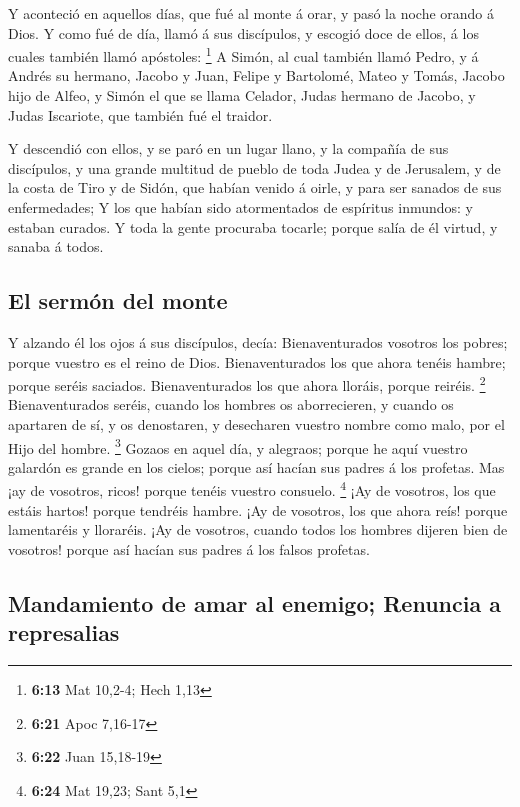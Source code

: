  Y aconteció en aquellos días, que fué al monte á orar, y
pasó la noche orando á Dios.  Y como fué de día, llamó á
sus discípulos, y escogió doce de ellos, á los cuales también llamó
apóstoles: \footnote{\textbf{6:13} Mat 10,2-4; Hech 1,13}
 A Simón, al cual también llamó Pedro, y á Andrés su
hermano, Jacobo y Juan, Felipe y Bartolomé,  Mateo y
Tomás, Jacobo hijo de Alfeo, y Simón el que se llama Celador,
 Judas hermano de Jacobo, y Judas Iscariote, que también
fué el traidor.

 Y descendió con ellos, y se paró en un lugar llano, y la
compañía de sus discípulos, y una grande multitud de pueblo de toda
Judea y de Jerusalem, y de la costa de Tiro y de Sidón, que habían
venido á oirle, y para ser sanados de sus enfermedades; 
Y los que habían sido atormentados de espíritus inmundos: y estaban
curados.  Y toda la gente procuraba tocarle; porque salía
de él virtud, y sanaba á todos.

\hypertarget{el-sermuxf3n-del-monte}{%
\subsection{El sermón del monte}\label{el-sermuxf3n-del-monte}}

 Y alzando él los ojos á sus discípulos, decía:
Bienaventurados vosotros los pobres; porque vuestro es el reino de Dios.
 Bienaventurados los que ahora tenéis hambre; porque
seréis saciados. Bienaventurados los que ahora lloráis, porque reiréis.
\footnote{\textbf{6:21} Apoc 7,16-17}  Bienaventurados
seréis, cuando los hombres os aborrecieren, y cuando os apartaren de sí,
y os denostaren, y desecharen vuestro nombre como malo, por el Hijo del
hombre. \footnote{\textbf{6:22} Juan 15,18-19}  Gozaos en
aquel día, y alegraos; porque he aquí vuestro galardón es grande en los
cielos; porque así hacían sus padres á los profetas.  Mas
¡ay de vosotros, ricos! porque tenéis vuestro consuelo. \footnote{\textbf{6:24}
  Mat 19,23; Sant 5,1}  ¡Ay de vosotros, los que estáis
hartos! porque tendréis hambre. ¡Ay de vosotros, los que ahora reís!
porque lamentaréis y lloraréis.  ¡Ay de vosotros, cuando
todos los hombres dijeren bien de vosotros! porque así hacían sus padres
á los falsos profetas.

\hypertarget{mandamiento-de-amar-al-enemigo-renuncia-a-represalias}{%
\subsection{Mandamiento de amar al enemigo; Renuncia a
represalias}\label{mandamiento-de-amar-al-enemigo-renuncia-a-represalias}}

